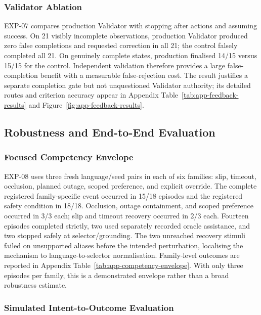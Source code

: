 \documentclass{article}
\begin{document}
\subsubsection{Validator Ablation}

EXP-07 compares production Validator with stopping after actions and assuming
success. On 21 visibly incomplete observations, production Validator produced
zero false completions and requested correction in all 21; the control falsely
completed all 21. On genuinely complete states, production finalised 14/15
versus 15/15 for the control. Independent validation therefore provides a large
false-completion benefit with a measurable false-rejection cost. The result
justifies a separate completion gate but not unquestioned Validator authority;
its detailed routes and criterion accuracy appear in Appendix
Table~\ref{tab:app-feedback-results} and
Figure~\ref{fig:app-feedback-results}.

\subsection{Robustness and End-to-End Evaluation}
\label{subsec:evaluation-end-to-end}

\subsubsection{Focused Competency Envelope}

EXP-08 uses three fresh language/seed pairs in each of six families: slip,
timeout, occlusion, planned outage, scoped preference, and explicit override.
The complete registered family-specific event occurred in 15/18 episodes and
the registered safety condition in 18/18. Occlusion, outage containment, and
scoped preference occurred in 3/3 each; slip and timeout recovery occurred in
2/3 each. Fourteen episodes completed strictly, two used separately recorded
oracle assistance, and two stopped safely at selector/grounding. The two
unreached recovery stimuli failed on unsupported aliases before the intended
perturbation, localising the mechanism to language-to-selector normalisation.
Family-level outcomes are reported in Appendix
Table~\ref{tab:app-competency-envelope}. With only three episodes per family,
this is a demonstrated envelope rather than a broad robustness estimate.

\subsubsection{Simulated Intent-to-Outcome Evaluation}
\end{document}
